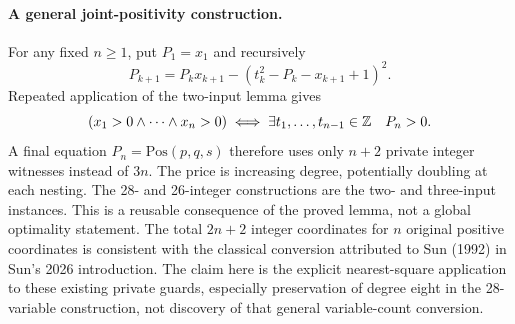 \paragraph{A general joint-positivity construction.}
For any fixed $n\ge1$, put $P_1=x_1$ and recursively
\[
 P_{k+1}=P_kx_{k+1}-(t_k^2-P_k-x_{k+1}+1)^2.
\]
Repeated application of the two-input lemma gives
\[
 (x_1>0\wedge\cdots\wedge x_n>0)
 \iff\exists t_1,\ldots,t_{n-1}\in\mathbb Z\quad P_n>0.
\]
A final equation $P_n=\mathrm{Pos}(p,q,s)$ therefore uses only $n+2$
private integer witnesses instead of $3n$. The price is increasing
degree, potentially doubling at each nesting. The 28- and 26-integer
constructions are the two- and three-input instances. This is a reusable
consequence of the proved lemma, not a global optimality statement.
The total $2n+2$ integer coordinates for $n$ original positive coordinates
is consistent with the classical conversion attributed to Sun (1992) in
Sun's 2026 introduction. The claim here is the explicit nearest-square
application to these existing private guards, especially preservation of
degree eight in the 28-variable construction, not discovery of that general
variable-count conversion.
